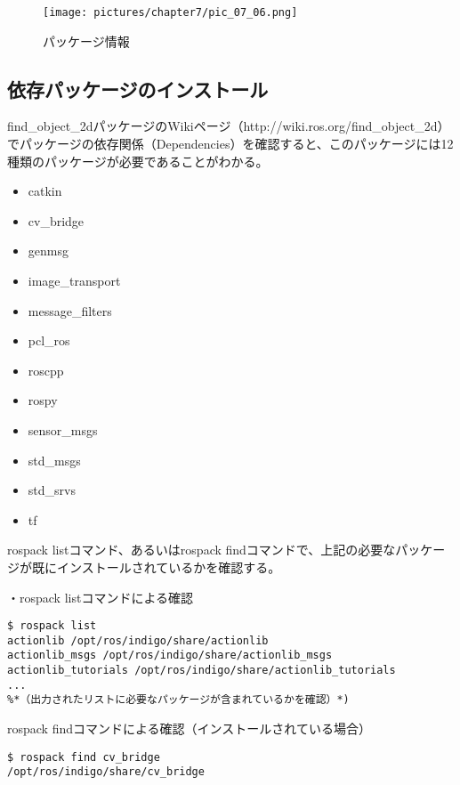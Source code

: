 \begin{figure}[htp]
  \centering
  \texttt{[image: pictures/chapter7/pic\_07\_06.png]}
  \caption{パッケージ情報}
\end{figure}

\subsection{依存パッケージのインストール}

find\_object\_2dパッケージのWikiページ（http://wiki.ros.org/find\_object\_2d）でパッケージの依存関係（Dependencies）を確認すると、このパッケージには12種類のパッケージが必要であることがわかる。

\vspace{\baselineskip}
\begin{itemize}
\item catkin
\item cv\_bridge
\item genmsg
\item image\_transport
\item message\_filters
\item pcl\_ros
\item roscpp
\item rospy
\item sensor\_msgs
\item std\_msgs
\item std\_srvs
\item tf
\end{itemize}
\vspace{\baselineskip}

rospack listコマンド、あるいはrospack findコマンドで、上記の必要なパッケージが既にインストールされているかを確認する。
\vspace{\baselineskip}

・rospack listコマンドによる確認
\begin{lstlisting}[language=ROS]
$ rospack list
actionlib /opt/ros/indigo/share/actionlib
actionlib_msgs /opt/ros/indigo/share/actionlib_msgs
actionlib_tutorials /opt/ros/indigo/share/actionlib_tutorials
...
%*（出力されたリストに必要なパッケージが含まれているかを確認）*)
\end{lstlisting}

rospack findコマンドによる確認（インストールされている場合）

\begin{lstlisting}[language=ROS]
$ rospack find cv_bridge
/opt/ros/indigo/share/cv_bridge
\end{lstlisting}

